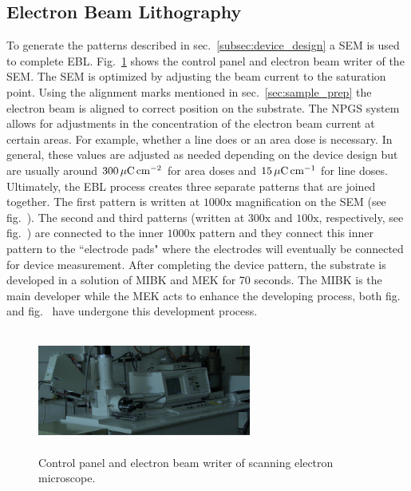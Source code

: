 \subsection{Electron Beam Lithography}\label{subsec:lithography}
To generate the patterns described in sec.~\ref{subsec:device_design} a \acs{SEM} is used to complete \acs{EBL}. Fig.~\ref{fig:SEM_machine} shows the control panel and electron beam writer of the \acs{SEM}. The \acs{SEM} is optimized by adjusting the beam current to the saturation point. Using the alignment marks mentioned in sec.~\ref{sec:sample_prep} the electron beam is aligned to correct position on the substrate. The \acs{NPGS} system allows for adjustments in the concentration of the electron beam current at certain areas. For example, whether a line does or an area dose is necessary. In general, these values are adjusted as needed depending on the device design but are usually around $300\,\mathrm{\mu C}\,\mathrm{cm}^{-2}$ for area doses and $15\,\mathrm{\mu C}\,\mathrm{cm}^{-1}$ for line doses. Ultimately, the \acs{EBL} process creates three separate patterns that are joined together. The first pattern is written at $1000\mathrm{x}$ magnification on the \acs{SEM} (see fig.~). The second and third patterns (written at $300\mathrm{x}$ and $100\mathrm{x}$, respectively, see fig.~) are connected to the inner $1000\mathrm{x}$ pattern and they connect this inner pattern to the ``electrode pads" where the electrodes will eventually be connected for device measurement. After completing the device pattern, the substrate is developed in a solution of \ac{MIBK} and \ac{MEK} for 70 seconds. The \acs{MIBK} is the main developer while the \acs{MEK} acts to enhance the developing process, both fig.~ and fig.~ have undergone this development process.
\begin{figure}[ht]
	\centering
	\includegraphics[height=4cm,width=7cm]{figs/experimental/SEM}
	\caption[Scanning electron microscope]{Control panel and electron beam writer of scanning electron microscope.}
	\label{fig:SEM_machine}
\end{figure}

